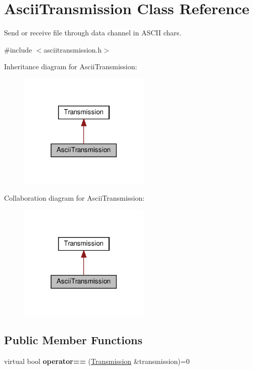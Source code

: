 \hypertarget{classAsciiTransmission}{}\section{Ascii\+Transmission Class Reference}
\label{classAsciiTransmission}


Send or receive file through data channel in A\+S\+C\+II chars.  




{\ttfamily \#include $<$asciitransmission.\+h$>$}



Inheritance diagram for Ascii\+Transmission\+:
\nopagebreak
\begin{figure}[H]
\begin{center}
\leavevmode
\includegraphics[width=177pt]{classAsciiTransmission__inherit__graph}
\end{center}
\end{figure}


Collaboration diagram for Ascii\+Transmission\+:
\nopagebreak
\begin{figure}[H]
\begin{center}
\leavevmode
\includegraphics[width=177pt]{classAsciiTransmission__coll__graph}
\end{center}
\end{figure}
\subsection*{Public Member Functions}
\begin{DoxyCompactItemize}
\item 
\mbox{\label{classAsciiTransmission_aa5f51d223ded66d2dfeee3120593a019}} 
virtual bool {\bfseries operator==} (\hyperlink{classTransmission}{Transmission} \&transmission)=0
\end{DoxyCompactItemize}


